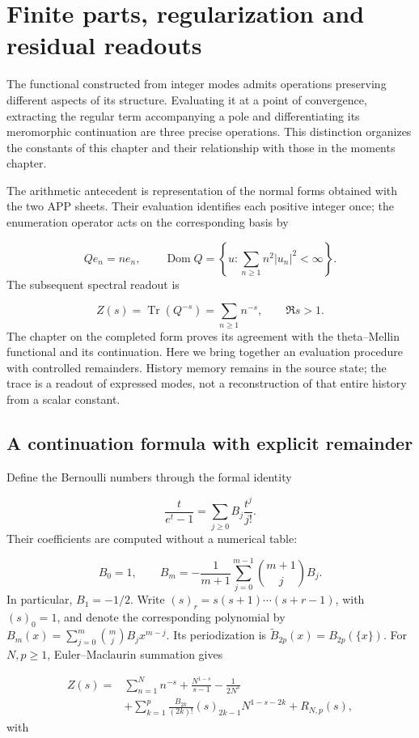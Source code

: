 \section{Finite parts, regularization and residual readouts}
\label{lectura:manuscrito-04}
The functional constructed from integer modes admits operations preserving different aspects of its structure. Evaluating it at a point of convergence, extracting the regular term accompanying a pole and differentiating its meromorphic continuation are three precise operations. This distinction organizes the constants of this chapter and their relationship with those in the moments chapter.

The arithmetic antecedent is representation of the normal forms obtained with the two APP sheets. Their evaluation identifies each positive integer once; the enumeration operator acts on the corresponding basis by

\[
Qe_n=ne_n,\qquad
\operatorname{Dom}Q=\left\{u:\sum_{n\geq1}n^2|u_n|^2<\infty\right\}.
\]
The subsequent spectral readout is

\[
Z(s)=\operatorname{Tr}(Q^{-s})=\sum_{n\geq1}n^{-s},\qquad \Re s>1.
\]
The chapter on the completed form proves its agreement with the theta–Mellin functional and its continuation. Here we bring together an evaluation procedure with controlled remainders. History memory remains in the source state; the trace is a readout of expressed modes, not a reconstruction of that entire history from a scalar constant.

\subsection{A continuation formula with explicit remainder}
Define the Bernoulli numbers through the formal identity

\[
\frac{t}{e^t-1}=\sum_{j\geq0}B_j\frac{t^j}{j!}.
\]
Their coefficients are computed without a numerical table:

\[
B_0=1,\qquad
B_m=-\frac1{m+1}\sum_{j=0}^{m-1}\binom{m+1}{j}B_j.
\]
In particular, \(B_1=-1/2\). Write \((s)_r=s(s+1)\cdots(s+r-1)\), with \((s)_0=1\), and denote the corresponding polynomial by \(B_m(x)=\sum_{j=0}^m\binom mjB_jx^{m-j}\). Its periodization is \(\widetilde B_{2p}(x)=B_{2p}(\{x\})\). For \(N,p\geq1\), Euler–Maclaurin summation gives

\[
\begin{aligned}
Z(s)={}&\sum_{n=1}^N n^{-s}+\frac{N^{1-s}}{s-1}-\frac1{2N^s}\\
&+\sum_{k=1}^p\frac{B_{2k}}{(2k)!}(s)_{2k-1}N^{1-s-2k}
+R_{N,p}(s),
\end{aligned}
\]
with

